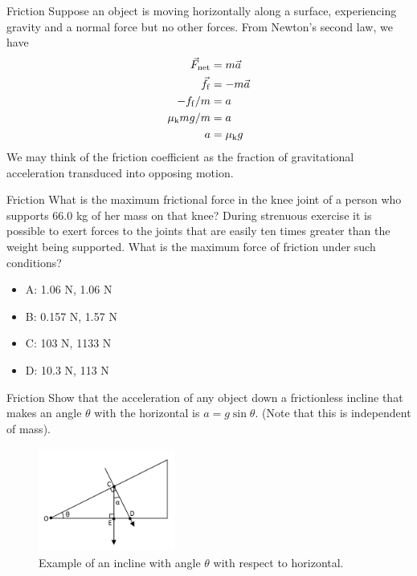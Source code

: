 \documentclass{beamer}
\begin{document}
\begin{frame}{Friction}
Suppose an object is moving horizontally along a surface, experiencing gravity and a normal force but no other forces.  From Newton's second law, we have \\
\begin{align}
\vec{F}_{\rm net} &= m \vec{a} \\
\vec{f}_{\rm f} &= -m\vec{a} \\
-f_{\rm f}/m &= a \\
\mu_{\rm k} m g / m &= a \\
a &= \mu_{\rm k} g
\end{align}
We may think of the friction coefficient as the fraction of gravitational acceleration transduced into opposing motion.
\end{frame}

\begin{frame}{Friction}
What is the maximum frictional force in the knee joint of a person who supports 66.0 kg of her mass on that knee?  During strenuous exercise it is possible to exert forces to the joints that are easily ten times greater than the weight being supported. What is the maximum force of friction under such conditions?
\begin{itemize}
\item A: 1.06 N, 1.06 N
\item B: 0.157 N, 1.57 N
\item C: 103 N, 1133 N
\item D: 10.3 N, 113 N
\end{itemize}
\end{frame}

\begin{frame}{Friction}
Show that the acceleration of any object down a frictionless incline that makes an angle $\theta$ with the horizontal is $a = g\sin\theta$.  (Note that this is independent of mass).
\begin{figure}
\centering
\includegraphics[width=0.4\textwidth]{figures/incline.png}
\caption{\label{fig:incline} Example of an incline with angle $\theta$ with respect to horizontal.}
\end{figure}
\end{frame}
\end{document}
